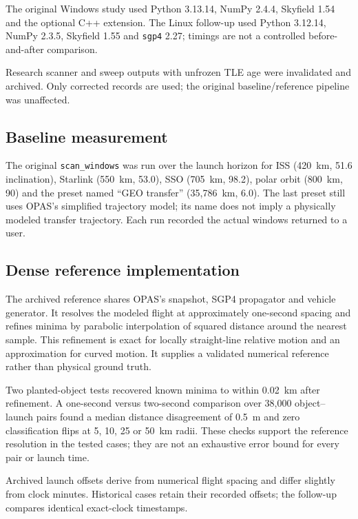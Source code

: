 \documentclass[11pt,a4paper]{article}
\begin{document}
The original Windows study used Python 3.13.14, NumPy 2.4.4, Skyfield 1.54
and the optional C++ extension. The Linux follow-up used Python 3.12.14,
NumPy 2.3.5, Skyfield 1.55 and \texttt{sgp4} 2.27; timings are not a
controlled before-and-after comparison.

Research scanner and sweep outputs with unfrozen TLE age were invalidated
and archived. Only corrected records are used; the original
baseline/reference pipeline was unaffected.

\subsection{Baseline measurement}

The original \texttt{scan\_windows} was run over the launch horizon for
ISS (420~km, 51.6\textdegree{} inclination), Starlink (550~km,
53.0\textdegree{}), SSO (705~km, 98.2\textdegree{}), polar orbit
(800~km, 90\textdegree{}) and the preset named ``GEO transfer''
(35,786~km, 6.0\textdegree{}). The last preset still uses OPAS's simplified
trajectory model; its name does not imply a physically modeled transfer
trajectory. Each run recorded the actual windows returned to a user.

\subsection{Dense reference implementation}

The archived reference shares OPAS's snapshot, SGP4 propagator and vehicle
generator. It resolves the modeled flight at approximately one-second
spacing and refines minima by parabolic interpolation of squared distance
around the nearest sample. This refinement is exact for locally
straight-line relative motion and an approximation for curved motion.
It supplies a validated numerical reference rather than physical ground
truth.

Two planted-object tests recovered known minima to within 0.02~km after
refinement. A one-second versus two-second comparison over 38,000
object--launch pairs found a median distance disagreement of 0.5~m and
zero classification flips at 5, 10, 25 or 50~km radii. These checks support
the reference resolution in the tested cases; they are not an exhaustive
error bound for every pair or launch time.

Archived launch offsets derive from numerical flight spacing and differ
slightly from clock minutes. Historical cases retain their recorded offsets;
the follow-up compares identical exact-clock timestamps.
\end{document}
